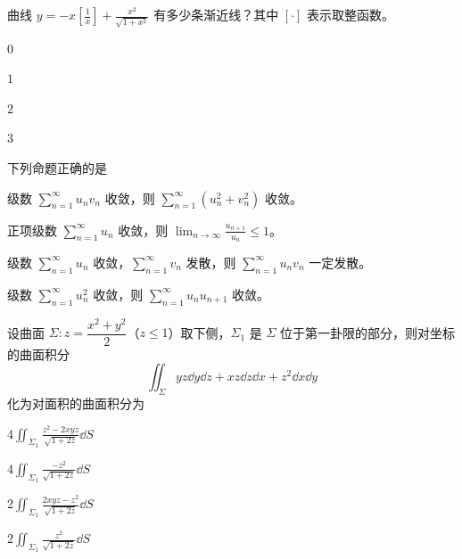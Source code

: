
\begin{question}[index=1]
曲线 $\displaystyle y=-x\left[\frac1x\right]+\frac{x^2}{\sqrt{1+x^2}}$ 有多少条渐近线？其中 $[\cdot]$ 表示取整函数。
\begin{choices}[columns=4]
\item $0$
\item $1$
\item $2$
\item $3$
\end{choices}
\end{question}
\QuestionBreak

\begin{question}[index=2]
下列命题正确的是
\begin{choices}[columns=1]
\item 级数 $\displaystyle\sum_{n=1}^{\infty}u_nv_n$ 收敛，则 $\displaystyle\sum_{n=1}^{\infty}(u_n^2+v_n^2)$ 收敛。
\item 正项级数 $\displaystyle\sum_{n=1}^{\infty}u_n$ 收敛，则 $\displaystyle\lim_{n\to\infty}\frac{u_{n+1}}{u_n}\le1$。
\item 级数 $\displaystyle\sum_{n=1}^{\infty}u_n$ 收敛，$\displaystyle\sum_{n=1}^{\infty}v_n$ 发散，则 $\displaystyle\sum_{n=1}^{\infty}u_nv_n$ 一定发散。
\item 级数 $\displaystyle\sum_{n=1}^{\infty}u_n^2$ 收敛，则 $\displaystyle\sum_{n=1}^{\infty}u_nu_{n+1}$ 收敛。
\end{choices}
\end{question}
\QuestionBreak

\begin{question}[index=3]
设曲面 $\Sigma\colon z=\dfrac{x^2+y^2}{2}$（$z\le1$）取下侧，$\Sigma_1$ 是 $\Sigma$ 位于第一卦限的部分，则对坐标的曲面积分
\[
  \iint_{\Sigma} yz\dd y\dd z+xz\dd z\dd x+z^2\dd x\dd y
\]
化为对面积的曲面积分为
\begin{choices}[columns=2]
\item $\displaystyle 4\iint_{\Sigma_1}\frac{z^2-2xyz}{\sqrt{1+2z}}\dd S$
\item $\displaystyle 4\iint_{\Sigma_1}\frac{-z^2}{\sqrt{1+2z}}\dd S$
\item $\displaystyle 2\iint_{\Sigma_1}\frac{2xyz-z^2}{\sqrt{1+2z}}\dd S$
\item $\displaystyle 2\iint_{\Sigma_1}\frac{z^2}{\sqrt{1+2z}}\dd S$
\end{choices}
\end{question}
\QuestionBreak

